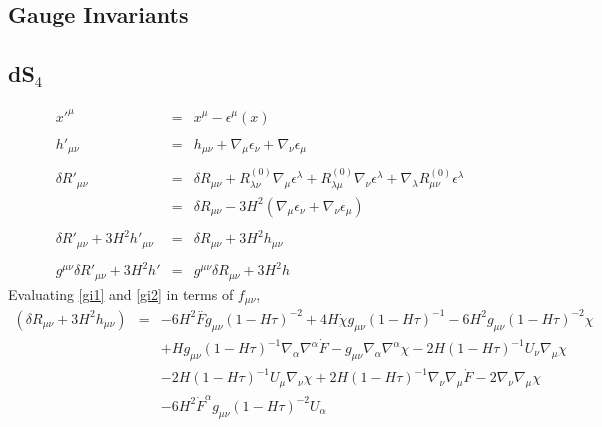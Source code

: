 \documentclass[10pt,letterpaper]{article}
\numberwithin{equation}{section}
\begin{document}
\begin{appendices}
\newpage
%
%
\section{Gauge Invariants}
%
\subsection{dS$_{4}$}
%
\begin{eqnarray}
x'^\mu &=& x^\mu - \epsilon^\mu(x)
\\ \nonumber\\
h'_{\mu\nu} &=&  h_{\mu\nu} + \nabla_\mu\epsilon_\nu + \nabla_\nu \epsilon_\mu 
\\ \nonumber\\
\delta R'_{\mu\nu} &=& \delta R_{\mu\nu} + R^{(0)}_{\lambda\nu} \nabla_\mu \epsilon^\lambda + R^{(0)}_{\lambda\mu} \nabla_\nu \epsilon^\lambda + \nabla_\lambda R^{(0)}_{\mu\nu} \epsilon^\lambda
\nonumber\\
&=& \delta R_{\mu\nu} -3H^2 ( \nabla_\mu \epsilon_\nu + \nabla_\nu \epsilon_\mu )
\\ \nonumber\\
\delta R'_{\mu\nu} + 3H^2 h'_{\mu\nu} &=& \delta R_{\mu\nu} + 3H^2 h_{\mu\nu}
\label{gi1}
\\ \nonumber\\
g^{\mu\nu} \delta R'_{\mu\nu} + 3H^2 h' &=& g^{\mu\nu} \delta R_{\mu\nu} + 3H^2 h
\label{gi2}
\end{eqnarray}
Evaluating \eqref{gi1} and \eqref{gi2} in terms of $f_{\mu\nu}$, 
\begin{eqnarray}
(\delta R_{\mu\nu} + 3H^2 h_{\mu\nu}) &=&
-6 H^2 \overset{..}{F} g_{\mu \nu } (1 -  H \tau)^{-2}
+ 4 H \dot{\chi} g_{\mu \nu } (1 -  H \tau)^{-1}
- 6 H^2 g_{\mu \nu } (1 -  H \tau)^{-2} \chi\nonumber\\
&& + H g_{\mu \nu } (1 -  H \tau)^{-1} \nabla_{\alpha }\nabla^{\alpha }\dot{F}
-  g_{\mu \nu } \nabla_{\alpha }\nabla^{\alpha }\chi
- 2 H (1 -  H \tau)^{-1} U_{\nu } \nabla_{\mu }\chi\nonumber\\
&& - 2 H (1 -  H \tau)^{-1} U_{\mu } \nabla_{\nu }\chi
+ 2 H (1 -  H \tau)^{-1} \nabla_{\nu }\nabla_{\mu }\dot{F}
- 2 \nabla_{\nu }\nabla_{\mu }\chi
\nonumber\\
&&
-6 H^2 \dot{F}^{\alpha } g_{\mu \nu } (1 -  H \tau)^{-2} U_{\alpha }

\end{eqnarray}
\end{appendices}
\end{document}
